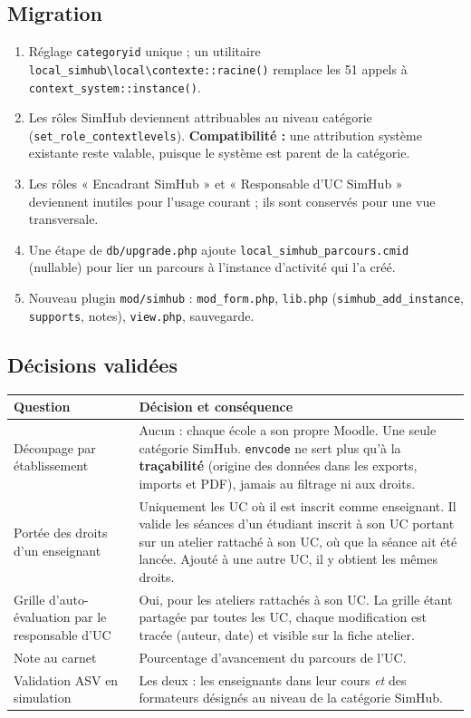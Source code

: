 \documentclass[11pt,a4paper]{article}
\newcommand{\code}[1]{\texttt{\small #1}}
\begin{document}
\subsection{Migration}
\begin{enumerate}
  \item Réglage \code{categoryid} unique ; un utilitaire
  \code{local\_simhub\textbackslash local\textbackslash contexte::racine()} remplace les 51
  appels à \code{context\_system::instance()}.
  \item Les rôles SimHub deviennent attribuables au niveau catégorie
  (\code{set\_role\_contextlevels}). \textbf{Compatibilité :} une attribution système
  existante reste valable, puisque le système est parent de la catégorie.
  \item Les rôles « Encadrant SimHub » et « Responsable d'UC SimHub » deviennent inutiles
  pour l'usage courant ; ils sont conservés pour une vue transversale.
  \item Une étape de \code{db/upgrade.php} ajoute \code{local\_simhub\_parcours.cmid}
  (nullable) pour lier un parcours à l'instance d'activité qui l'a créé.
  \item Nouveau plugin \code{mod/simhub} : \code{mod\_form.php}, \code{lib.php}
  (\code{simhub\_add\_instance}, \code{supports}, notes), \code{view.php}, sauvegarde.
\end{enumerate}

\subsection{Décisions validées}
\begin{center}
\begin{tabularx}{\textwidth}{>{\raggedright}p{5.2cm}X}
\toprule
\textbf{Question} & \textbf{Décision et conséquence} \\
\midrule
Découpage par établissement & Aucun : chaque école a son propre Moodle. Une seule
catégorie SimHub. \code{envcode} ne sert plus qu'à la \textbf{traçabilité} (origine des
données dans les exports, imports et PDF), jamais au filtrage ni aux droits. \\
\addlinespace
Portée des droits d'un enseignant & Uniquement les UC où il est inscrit comme enseignant.
Il valide les séances d'un étudiant inscrit à son UC portant sur un atelier rattaché à son
UC, où que la séance ait été lancée. Ajouté à une autre UC, il y obtient les mêmes droits. \\
\addlinespace
Grille d'auto-évaluation par le responsable d'UC & Oui, pour les ateliers rattachés à son
UC. La grille étant partagée par toutes les UC, chaque modification est tracée
(auteur, date) et visible sur la fiche atelier. \\
\addlinespace
Note au carnet & Pourcentage d'avancement du parcours de l'UC. \\
\addlinespace
Validation ASV en simulation & Les deux : les enseignants dans leur cours \emph{et} des
formateurs désignés au niveau de la catégorie SimHub. \\
\bottomrule
\end{tabularx}
\end{center}
\end{document}

